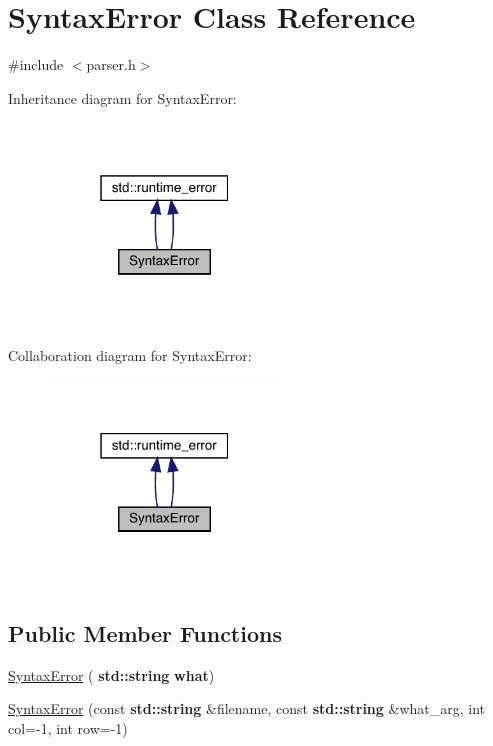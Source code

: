 \hypertarget{class_syntax_error}{}\section{Syntax\+Error Class Reference}
\label{class_syntax_error}


{\ttfamily \#include $<$parser.\+h$>$}



Inheritance diagram for Syntax\+Error\+:\nopagebreak
\begin{figure}[H]
\begin{center}
\leavevmode
\includegraphics[width=175pt]{class_syntax_error__inherit__graph}
\end{center}
\end{figure}


Collaboration diagram for Syntax\+Error\+:\nopagebreak
\begin{figure}[H]
\begin{center}
\leavevmode
\includegraphics[width=175pt]{class_syntax_error__coll__graph}
\end{center}
\end{figure}
\subsection*{Public Member Functions}
\begin{DoxyCompactItemize}
\item 
\hyperlink{class_syntax_error_a9da44f87a053ae6c01a0504a67d6dd9b}{Syntax\+Error} (\textbf{ std\+::string} \textbf{ what})
\item 
\hyperlink{class_syntax_error_a16dc968369bcbe16544f01e53dfd97d0}{Syntax\+Error} (const \textbf{ std\+::string} \&filename, const \textbf{ std\+::string} \&what\+\_\+arg, int col=-\/1, int row=-\/1)
\end{DoxyCompactItemize}


